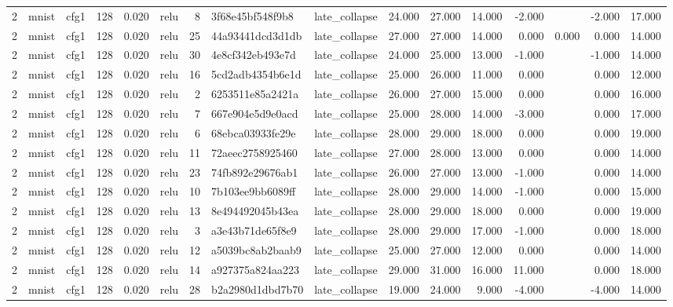 \begin{table}[htbp]
{\begin{tabular}{@{}rllrrlrllrrrrrrr@{}}
2 & mnist & cfg1 & 128 & 0.020 & relu & 8 & 3f68e45bf548f9b8 & late\_collapse & 24.000 & 27.000 & 14.000 & -2.000 &  & -2.000 & 17.000 \\
2 & mnist & cfg1 & 128 & 0.020 & relu & 25 & 44a93441dcd3d1db & late\_collapse & 27.000 & 27.000 & 14.000 & 0.000 & 0.000 & 0.000 & 14.000 \\
2 & mnist & cfg1 & 128 & 0.020 & relu & 30 & 4e8cf342eb493e7d & late\_collapse & 24.000 & 25.000 & 13.000 & -1.000 &  & -1.000 & 14.000 \\
2 & mnist & cfg1 & 128 & 0.020 & relu & 16 & 5cd2adb4354b6e1d & late\_collapse & 25.000 & 26.000 & 11.000 & 0.000 &  & 0.000 & 12.000 \\
2 & mnist & cfg1 & 128 & 0.020 & relu & 2 & 6253511e85a2421a & late\_collapse & 26.000 & 27.000 & 15.000 & 0.000 &  & 0.000 & 16.000 \\
2 & mnist & cfg1 & 128 & 0.020 & relu & 7 & 667e904e5d9e0acd & late\_collapse & 25.000 & 28.000 & 14.000 & -3.000 &  & 0.000 & 17.000 \\
2 & mnist & cfg1 & 128 & 0.020 & relu & 6 & 68ebca03933fe29e & late\_collapse & 28.000 & 29.000 & 18.000 & 0.000 &  & 0.000 & 19.000 \\
2 & mnist & cfg1 & 128 & 0.020 & relu & 11 & 72aeec2758925460 & late\_collapse & 27.000 & 28.000 & 13.000 & 0.000 &  & 0.000 & 14.000 \\
2 & mnist & cfg1 & 128 & 0.020 & relu & 23 & 74fb892e29676ab1 & late\_collapse & 26.000 & 27.000 & 13.000 & -1.000 &  & 0.000 & 14.000 \\
2 & mnist & cfg1 & 128 & 0.020 & relu & 10 & 7b103ee9bb6089ff & late\_collapse & 28.000 & 29.000 & 14.000 & -1.000 &  & 0.000 & 15.000 \\
2 & mnist & cfg1 & 128 & 0.020 & relu & 13 & 8e494492045b43ea & late\_collapse & 28.000 & 29.000 & 18.000 & 0.000 &  & 0.000 & 19.000 \\
2 & mnist & cfg1 & 128 & 0.020 & relu & 3 & a3e43b71de65f8e9 & late\_collapse & 28.000 & 29.000 & 17.000 & -1.000 &  & 0.000 & 18.000 \\
2 & mnist & cfg1 & 128 & 0.020 & relu & 12 & a5039bc8ab2baab9 & late\_collapse & 25.000 & 27.000 & 12.000 & 0.000 &  & 0.000 & 14.000 \\
2 & mnist & cfg1 & 128 & 0.020 & relu & 14 & a927375a824aa223 & late\_collapse & 29.000 & 31.000 & 16.000 & 11.000 &  & 0.000 & 18.000 \\
2 & mnist & cfg1 & 128 & 0.020 & relu & 28 & b2a2980d1dbd7b70 & late\_collapse & 19.000 & 24.000 & 9.000 & -4.000 &  & -4.000 & 14.000 \\

\end{tabular}}
\end{table}
